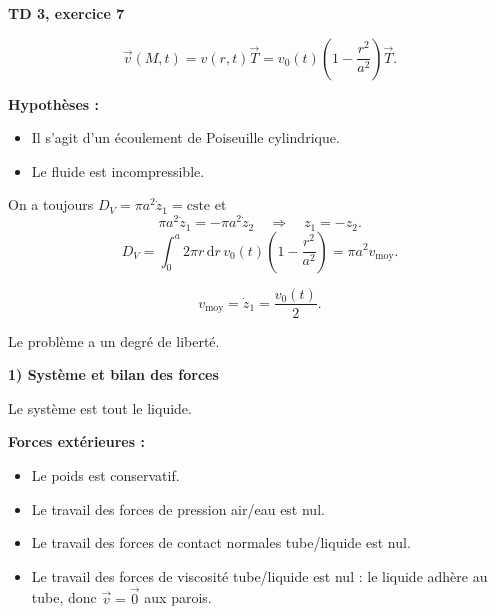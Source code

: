 \documentclass[11pt,a4paper]{article}
\newcommand{\dd}{\mathrm d}
\newcommand{\cste}{\mathrm{cste}}
\newcommand{\etape}[1]{\par\medskip\textbf{#1}\par\nopagebreak[4]}
\begin{document}
\Needspace{65mm}
\begin{exemple}[breakable]
\textbf{TD 3, exercice 7}
\begin{center}\end{center}
\[\vec v(M,t)=v(r,t)\vec T=v_0(t)\left(1-\frac{r^2}{a^2}\right)\vec T.\]
\par\textbf{Hypothèses :}
\begin{itemize}
\item Il s'agit d'un écoulement de Poiseuille cylindrique.
\item Le fluide est incompressible.
\end{itemize}
On a toujours $D_V=\pi a^2\dot z_1=\cste$ et
\[\pi a^2\dot z_1=-\pi a^2\dot z_2\quad\Longrightarrow\quad z_1=-z_2.\]
\[D_V=\int_0^a2\pi r\,\dd r\,v_0(t)\left(1-\frac{r^2}{a^2}\right)=\pi a^2v_{\mathrm{moy}}.\]
\begin{cadre}\[v_{\mathrm{moy}}=\dot z_1=\frac{v_0(t)}2.\]\end{cadre}
Le problème a un degré de liberté.
\etape{1) Système et bilan des forces}
Le système est tout le liquide.
\par\par\medskip\noindent\begin{minipage}{\linewidth}
\textbf{Forces extérieures :}
\begin{itemize}\item Le poids est conservatif.
\item Le travail des forces de pression air/eau est nul.
\item Le travail des forces de contact normales tube/liquide est nul.
\item Le travail des forces de viscosité tube/liquide est nul : le liquide adhère au tube, donc $\vec v=\vec0$ aux parois.\end{itemize}

\end{minipage}
\end{exemple}
\end{document}

